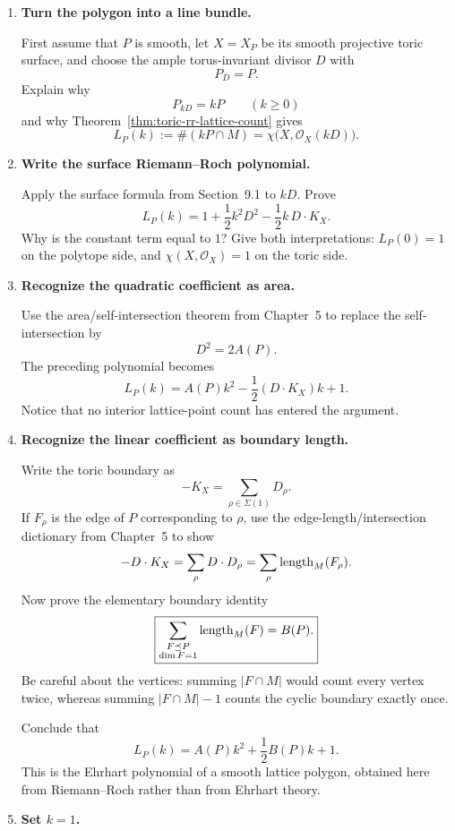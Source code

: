 \begin{enumerate}[label=\textbf{Hint \arabic*.},wide=0pt]

\item \textbf{Turn the polygon into a line bundle.}

First assume that \(P\) is smooth, let \(X=X_P\) be its smooth
projective toric surface, and choose the ample torus-invariant divisor
\(D\) with
\[
P_D=P.
\]
Explain why
\[
P_{kD}=kP
\qquad(k\geq0)
\]
and why Theorem~\ref{thm:toric-rr-lattice-count} gives
\[
L_P(k):=\#(kP\cap M)
=
\chi\bigl(X,\mathcal O_X(kD)\bigr).
\]

\item \textbf{Write the surface Riemann--Roch polynomial.}

Apply the surface formula from Section~9.1 to \(kD\).  Prove
\[
\boxed{
L_P(k)
=
1+\frac12k^2D^2-\frac12k\,D\cdot K_X.
}
\]
Why is the constant term equal to \(1\)?  Give both interpretations:
\(L_P(0)=1\) on the polytope side, and
\(\chi(X,\mathcal O_X)=1\) on the toric side.

\item \textbf{Recognize the quadratic coefficient as area.}

Use the area/self-intersection theorem from Chapter~5 to replace the
self-intersection by
\[
D^2=2A(P).
\]
The preceding polynomial becomes
\[
L_P(k)
=
A(P)k^2-\frac12(D\cdot K_X)k+1.
\]
Notice that no interior lattice-point count has entered the argument.

\item \textbf{Recognize the linear coefficient as boundary length.}

Write the toric boundary as
\[
-K_X=\sum_{\rho\in\Sigma(1)}D_\rho.
\]
If \(F_\rho\) is the edge of \(P\) corresponding to \(\rho\), use
the edge-length/intersection dictionary from Chapter~5 to show
\[
-D\cdot K_X
=
\sum_\rho D\cdot D_\rho
=
\sum_\rho\operatorname{length}_M(F_\rho).
\]
Now prove the elementary boundary identity
\[
\boxed{
\sum_{\substack{F\preceq P\\ \dim F=1}}
\operatorname{length}_M(F)=B(P).
}
\]
Be careful about the vertices: summing \(|F\cap M|\) would count every
vertex twice, whereas summing \(|F\cap M|-1\) counts the cyclic
boundary exactly once.

Conclude that
\[
\boxed{
L_P(k)
=
A(P)k^2+\frac12B(P)k+1.
}
\]
This is the Ehrhart polynomial of a smooth lattice polygon, obtained
here from Riemann--Roch rather than from Ehrhart theory.

\item \textbf{Set \(k=1\).}


\end{enumerate}
